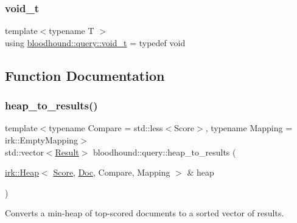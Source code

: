 \subsubsection{\texorpdfstring{void\+\_\+t}{void\_t}}
{\footnotesize\ttfamily template$<$typename T $>$ \\
using \mbox{\hyperlink{namespacebloodhound_1_1query_afd658a38b784a8187f8782905cb901e6}{bloodhound\+::query\+::void\+\_\+t}} = typedef void}



\subsection{Function Documentation}
\mbox{\label{namespacebloodhound_1_1query_a0437e798097dea85146811bdec5cc5fb}} 
\subsubsection{\texorpdfstring{heap\+\_\+to\+\_\+results()}{heap\_to\_results()}}
{\footnotesize\ttfamily template$<$typename Compare  = std\+::less$<$\+Score$>$, typename Mapping  = irk\+::\+Empty\+Mapping$>$ \\
std\+::vector$<$\mbox{\hyperlink{structbloodhound_1_1query_1_1Result}{Result}}$>$ bloodhound\+::query\+::heap\+\_\+to\+\_\+results (\begin{DoxyParamCaption}\item[{\mbox{\hyperlink{classirk_1_1Heap}{irk\+::\+Heap}}$<$ \mbox{\hyperlink{structbloodhound_1_1Score}{Score}}, \mbox{\hyperlink{structbloodhound_1_1Doc}{Doc}}, Compare, Mapping $>$ \&}]{heap }\end{DoxyParamCaption})}



Converts a min-\/heap of top-\/scored documents to a sorted vector of results. 

